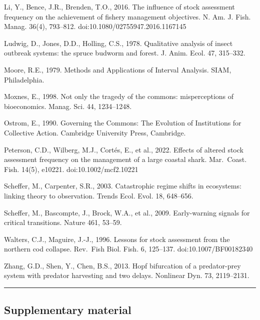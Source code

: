 \documentclass[11pt]{article}
\begin{document}
Li, Y., Bence, J.R., Brenden, T.O., 2016. The influence of stock
assessment frequency on the achievement of fishery management
objectives. N. Am. J. Fish. Manag. 36(4), 793--812.
doi:10.1080/02755947.2016.1167145

Ludwig, D., Jones, D.D., Holling, C.S., 1978. Qualitative analysis of
insect outbreak systems: the spruce budworm and forest. J. Anim. Ecol.
47, 315--332.

Moore, R.E., 1979. Methods and Applications of Interval Analysis. SIAM,
Philadelphia.

Moxnes, E., 1998. Not only the tragedy of the commons: misperceptions of
bioeconomics. Manag. Sci. 44, 1234--1248.

Ostrom, E., 1990. Governing the Commons: The Evolution of Institutions
for Collective Action. Cambridge University Press, Cambridge.

Peterson, C.D., Wilberg, M.J., Cort\'es, E., et al., 2022. Effects of
altered stock assessment frequency on the management of a large coastal
shark. Mar.~Coast. Fish. 14(5), e10221. doi:10.1002/mcf2.10221

Scheffer, M., Carpenter, S.R., 2003. Catastrophic regime shifts in
ecosystems: linking theory to observation. Trends Ecol. Evol. 18,
648--656.

Scheffer, M., Bascompte, J., Brock, W.A., et al., 2009. Early-warning
signals for critical transitions. Nature 461, 53--59.

Walters, C.J., Maguire, J.-J., 1996. Lessons for stock assessment from
the northern cod collapse. Rev.~Fish Biol. Fish. 6, 125--137.
doi:10.1007/BF00182340

Zhang, G.D., Shen, Y., Chen, B.S., 2013. Hopf bifurcation of a
predator-prey system with predator harvesting and two delays. Nonlinear
Dyn. 73, 2119--2131.

\begin{center}\rule{0.5\linewidth}{0.5pt}\end{center}

\subsection{Supplementary material}\label{supplementary-material}
\end{document}
